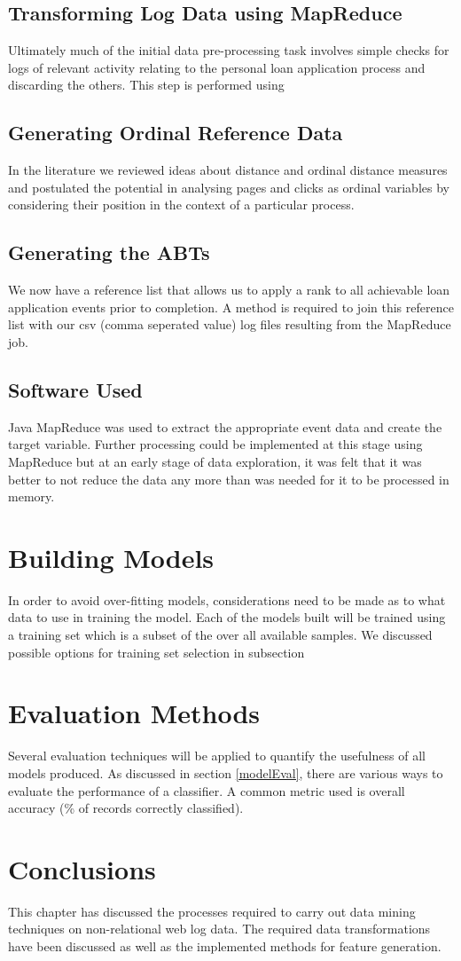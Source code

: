 \subsection{Transforming Log Data using MapReduce}
Ultimately much of the initial data pre-processing task involves simple checks for logs of relevant activity relating to the personal loan application process and discarding the others. This step is performed using 


\subsection{Generating Ordinal Reference Data}\label{ordRef}
In the literature we reviewed ideas about distance and ordinal distance measures and postulated the potential in analysing pages and clicks as ordinal variables by considering their position in the context of a particular process. 


\subsection{Generating the ABTs}
We now have a reference list that allows us to apply a rank to all achievable loan application events prior to completion. A method is required to join this reference list with our csv (comma seperated value) log files resulting from the MapReduce job. 


\subsection{Software Used}\label{soft}
Java MapReduce was used to extract the appropriate event data and create the target variable. Further processing could be implemented at this stage using MapReduce but at an early stage of data exploration, it was felt that it was better to not reduce the data any more than was needed for it to be processed in memory.


\section{Building Models}
In order to avoid over-fitting models, considerations need to be made as to what data to use in training the model. Each of the models built will be trained using a training set which is a subset of the over all available samples. We discussed possible options for training set selection in subsection


\section{Evaluation Methods}
Several evaluation techniques will be applied to quantify the usefulness of all models produced. As discussed in section \ref{modelEval}, there are various ways to evaluate the performance of a classifier. A common metric used is overall accuracy (\% of records correctly classified). 


\section{Conclusions}\label{desConc}
This chapter has discussed the processes required to carry out data mining techniques on non-relational web log data. The required data transformations have been discussed as well as the implemented methods for feature generation.




